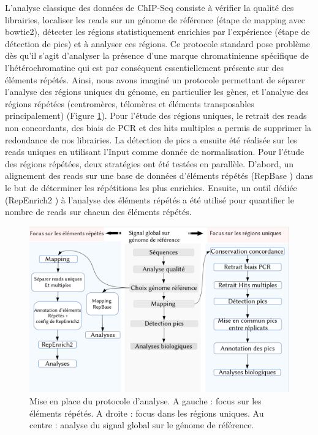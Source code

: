 \documentclass[a4paper,12pt,times]{report}
\newcommand{\scaption}[1]{\caption{\footnotesize{#1}}}
\begin{document}
   L'analyse classique des données de ChIP-Seq consiste à vérifier la qualité des librairies, localiser les reads sur un génome de référence (étape de mapping avec bowtie2), détecter les régions statistiquement enrichies par l'expérience (étape de détection de pics) et à analyser ces régions.
   \newline
   Ce protocole standard pose problème dès qu'il s'agit d'analyser la présence d'une marque chromatinienne spécifique de l'hétérochromatine qui est par conséquent essentiellement présente sur des éléments répétés.
   Ainsi, nous avons imaginé un protocole permettant de séparer l'analyse des régions uniques du génome, en particulier  les gènes, et l'analyse des régions répétées (centromères, télomères et éléments transposables principalement) (Figure \ref{Résultats expérimentaux}).
   \newline
   Pour l'étude des régions uniques, le retrait des reads non concordants, des biais de PCR et des hits multiples a permis de supprimer la redondance de nos librairies. La détection de pics a ensuite été réalisée sur les reads uniques en utilisant l'Input comme donnée de normalisation.
   \newline
  Pour l'étude des régions répétées, deux stratégies ont été testées en parallèle.
  \newline D'abord, un alignement des reads sur une base de données d'éléments répétés (RepBase \cite{repbase}) dans le but de déterminer les répétitions les plus enrichies.
  Ensuite, un outil dédiée (RepEnrich2 \cite{pmid25012247}) à l'analyse des éléments répétés a été utilisé pour quantifier le nombre de reads sur chacun des éléments répétés.

\begin{figure}[!ht]
\centering
\includegraphics[scale=0.53]{pipeline.png}
\scaption{ Mise en place du protocole d'analyse. A gauche : focus sur les éléments répétés. A droite : focus dans les régions uniques. Au centre : analyse du signal global sur le génome de référence.}
\label{Résultats expérimentaux} 
\end{figure}
\newpage
\end{document}
